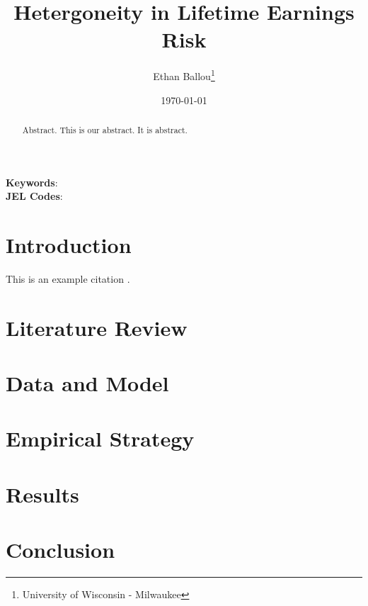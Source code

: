 \documentclass[12pt]{article}
\title{Hetergoneity in Lifetime Earnings Risk}
\author{Ethan Ballou\thanks{University of Wisconsin - Milwaukee}}
\date{\today}
\begin{document}
\maketitle
\thispagestyle{empty}



\begin{abstract}
\begin{singlespace}
\noindent 
Abstract.  This is our abstract.  It is abstract.  
\end{singlespace}
\end{abstract}
\noindent
\textbf{Keywords}: \\
\textbf{JEL Codes}: \\






\clearpage
\setcounter{page}{1}
\begin{center}
\end{center}




\section{Introduction}

This is an example citation \cite{exampleCitation}. \\ 


\section{Literature Review}

\section{Data and Model}

\section{Empirical Strategy}

\section{Results}

\section{Conclusion}
\end{document}
